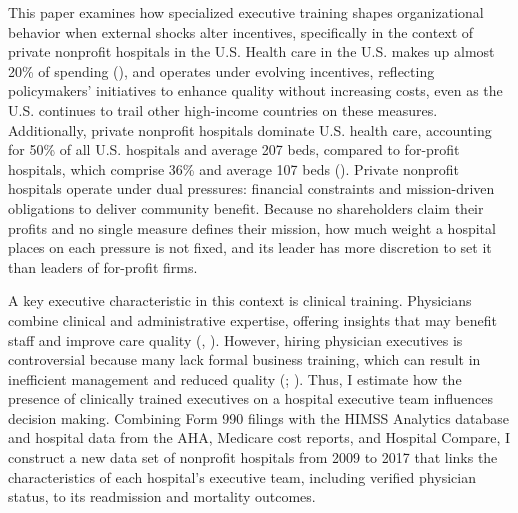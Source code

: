 \documentclass[12pt]{article}
\theoremstyle{definition}   %
\begin{document}
    This paper examines how specialized executive training shapes organizational behavior when external shocks alter incentives, specifically in the context of private nonprofit hospitals in the U.S. Health care in the U.S. makes up almost 20\% of spending (\cite{CMSNationalHealthExpenditure}), and operates under evolving incentives, reflecting policymakers’ initiatives to enhance quality without increasing costs, even as the U.S. continues to trail other high-income countries on these measures. Additionally, private nonprofit hospitals dominate U.S. health care, accounting for 50\% of all U.S. hospitals and average 207 beds, compared to for-profit hospitals, which comprise 36\% and average 107 beds (\cite{ASPE_2023}). Private nonprofit hospitals operate under dual pressures: financial constraints and mission-driven obligations to deliver community benefit. Because no shareholders claim their profits and no single measure defines their mission, how much weight a hospital places on each pressure is not fixed, and its leader has more discretion to set it than leaders of for-profit firms.
    
    A key executive characteristic in this context is clinical training. Physicians combine clinical and administrative expertise, offering insights that may benefit staff and improve care quality (\cite{Stajduhar_2023}, \cite{Ahmed_2022}). However, hiring physician executives is controversial because many lack formal business training, which can result in inefficient management and reduced quality (\cite{HarvardBusinessReview2018}; \cite{munoz2025managers}). Thus, I estimate how the presence of clinically trained executives on a hospital executive team influences decision making. Combining Form 990 filings with the HIMSS Analytics database and hospital data from the AHA, Medicare cost reports, and Hospital Compare, I construct a new data set of nonprofit hospitals from 2009 to 2017 that links the characteristics of each hospital’s executive team, including verified physician status, to its readmission and mortality outcomes.
    
\end{document}
